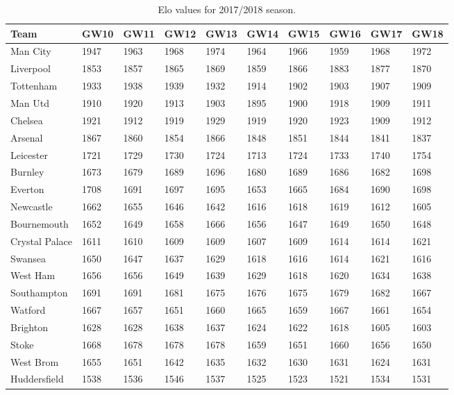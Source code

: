 \begin{table}[H]
\centering
\smaller
\begin{tabular}{|l|l|l|l|l|l|l|l|l|l|}
\hline
Team           & GW10 & GW11 & GW12 & GW13 & GW14 & GW15 & GW16 & GW17 & GW18 \\
\hline
Man City       & 1947 & 1963 & 1968 & 1974 & 1964 & 1966 & 1959 & 1968 & 1972 \\
Liverpool      & 1853 & 1857 & 1865 & 1869 & 1859 & 1866 & 1883 & 1877 & 1870 \\
Tottenham      & 1933 & 1938 & 1939 & 1932 & 1914 & 1902 & 1903 & 1907 & 1909 \\
Man Utd        & 1910 & 1920 & 1913 & 1903 & 1895 & 1900 & 1918 & 1909 & 1911 \\
Chelsea        & 1921 & 1912 & 1919 & 1929 & 1919 & 1920 & 1923 & 1909 & 1912 \\
Arsenal        & 1867 & 1860 & 1854 & 1866 & 1848 & 1851 & 1844 & 1841 & 1837 \\
Leicester      & 1721 & 1729 & 1730 & 1724 & 1713 & 1724 & 1733 & 1740 & 1754 \\
Burnley        & 1673 & 1679 & 1689 & 1696 & 1680 & 1689 & 1686 & 1682 & 1698 \\
Everton        & 1708 & 1691 & 1697 & 1695 & 1653 & 1665 & 1684 & 1690 & 1698 \\
Newcastle      & 1662 & 1655 & 1646 & 1642 & 1616 & 1618 & 1619 & 1612 & 1605 \\
Bournemouth    & 1652 & 1649 & 1658 & 1666 & 1656 & 1647 & 1649 & 1650 & 1648 \\
Crystal Palace & 1611 & 1610 & 1609 & 1609 & 1607 & 1609 & 1614 & 1614 & 1621 \\
Swansea        & 1650 & 1647 & 1637 & 1629 & 1618 & 1616 & 1614 & 1621 & 1616 \\
West Ham       & 1656 & 1656 & 1649 & 1639 & 1629 & 1618 & 1620 & 1634 & 1638 \\
Southampton    & 1691 & 1691 & 1681 & 1675 & 1676 & 1675 & 1679 & 1682 & 1667 \\
Watford        & 1667 & 1657 & 1651 & 1660 & 1665 & 1659 & 1667 & 1661 & 1654 \\
Brighton       & 1628 & 1628 & 1638 & 1637 & 1624 & 1622 & 1618 & 1605 & 1603 \\
Stoke          & 1668 & 1678 & 1678 & 1678 & 1659 & 1651 & 1660 & 1656 & 1650 \\
West Brom      & 1655 & 1651 & 1642 & 1635 & 1632 & 1630 & 1631 & 1624 & 1631 \\
Huddersfield   & 1538 & 1536 & 1546 & 1537 & 1525 & 1523 & 1521 & 1534 & 1531 \\
\hline
\end{tabular}
\caption{Elo values for 2017/2018 season.}
\label{tab:elo_values_gameweeks_2}
\end{table}


